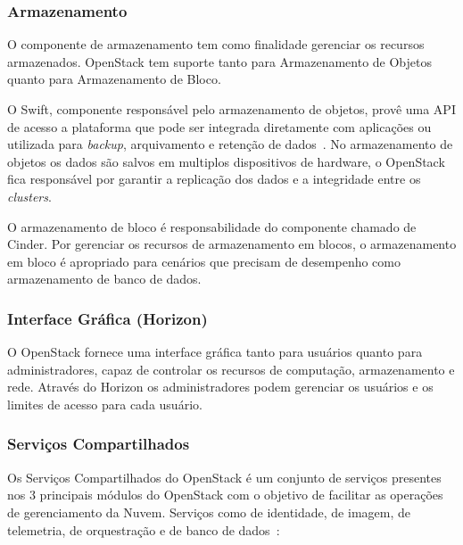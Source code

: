 \subsubsection{Armazenamento}

O componente de armazenamento tem como finalidade gerenciar os recursos armazenados. OpenStack tem suporte tanto para Armazenamento de Objetos quanto para Armazenamento de Bloco.

O Swift, componente responsável pelo armazenamento de objetos, provê uma API de acesso a plataforma que pode ser integrada diretamente com aplicações ou utilizada para \textit{backup}, arquivamento e retenção de dados~\cite{OpenStack:Online}. No armazenamento de objetos os dados são salvos em multiplos dispositivos de hardware, o OpenStack fica responsável por garantir a replicação dos dados e a integridade entre os \textit{clusters}. 

O armazenamento de bloco é responsabilidade do componente chamado de Cinder. Por gerenciar os recursos de armazenamento em blocos, o armazenamento em bloco é apropriado para cenários que precisam de desempenho como armazenamento de banco de dados.

\subsubsection{Interface Gráfica (Horizon)}

O OpenStack fornece uma interface gráfica tanto para usuários quanto para administradores, capaz de controlar os recursos de computação, armazenamento e rede. Através do Horizon os administradores podem gerenciar os usuários e os limites de acesso para cada usuário.

\subsubsection{Serviços Compartilhados}

Os Serviços Compartilhados do OpenStack é um conjunto de serviços presentes nos 3 principais módulos do OpenStack com o objetivo de facilitar as operações de gerenciamento da Nuvem. Serviços como de identidade, de imagem, de telemetria, de orquestração e de banco de dados~\cite{OpenStack:Online}:

